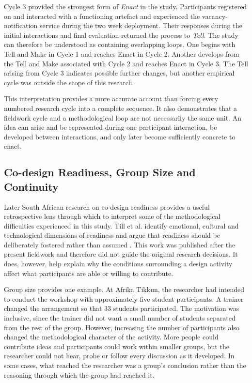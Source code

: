 Cycle 3 provided the strongest form of \textit{Enact} in the study. Participants registered on and interacted with a functioning artefact and experienced the vacancy-notification service during the two week deployment. Their responses during the initial interactions and final evaluation returned the process to \textit{Tell}. The study can therefore be understood as containing overlapping \tme{} loops. One begins with Tell and Make in Cycle 1 and reaches Enact in Cycle 2. Another develops from the Tell and Make associated with Cycle 2 and reaches Enact in Cycle 3. The Tell arising from Cycle 3 indicates possible further changes, but another empirical cycle was outside the scope of this research.

This interpretation provides a more accurate account than forcing every numbered research cycle into a complete \tme{} sequence. It also demonstrates that a fieldwork cycle and a methodological loop are not necessarily the same unit. An idea can arise and be represented during one participant interaction, be developed between interactions, and only later become sufficiently concrete to enact.


\subsection{Co-design Readiness, Group Size and Continuity}

Later South African research on co-design readiness provides a useful retrospective lens through which to interpret some of the methodological difficulties experienced in this study. Till et al. identify emotional, cultural and technological dimensions of readiness and argue that readiness should be deliberately fostered rather than assumed \cite{till2026}. This work was published after the present fieldwork and therefore did not guide the original research decisions. It does, however, help explain why the conditions surrounding a design activity affect what participants are able or willing to contribute.

Group size provides one example. At Afrika Tikkun, the researcher had intended to conduct the workshop with approximately five student participants. A trainer changed the arrangement so that 33 students participated. The motivation was inclusive, since the trainer did not want a small number of students separated from the rest of the group. However, increasing the number of participants also changed the methodological character of the activity. More people could contribute ideas and participants could work within smaller groups, but the researcher could not hear, probe or follow every discussion as it developed. In some cases, what reached the researcher was a group's conclusion rather than the reasoning through which the group had reached it.

